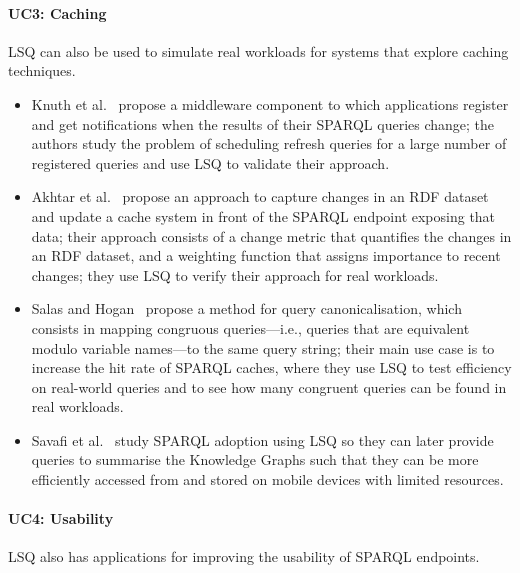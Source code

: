 \paragraph{UC3: Caching}
\label{sec-caching_uc}

LSQ can also be used to simulate real workloads for systems that explore caching techniques. 

\begin{itemize}
\item Knuth et al.~\cite{knuth2016scheduling} propose a middleware component to which applications register and get notifications when the results of their SPARQL queries change; the authors study the problem of scheduling refresh queries for a large number of registered queries and use LSQ to validate their approach. 
\item Akhtar et al.~\cite{akhtar2018change,akhtar2019dynamic} propose an approach to capture changes in an RDF dataset and update a cache system in front of the SPARQL endpoint exposing that data; their approach consists of a change metric that quantifies the changes in an RDF dataset, and a weighting function that assigns importance to recent changes; they use LSQ to verify their approach for real workloads. 
\item Salas and Hogan~\cite{SalasH18} propose a method for query canonicalisation, which consists in mapping congruous queries---i.e., queries that are equivalent modulo variable names---to the same query string; their main use case is to increase the hit rate of SPARQL caches, where they use LSQ to test efficiency on real-world queries and to see how many congruent queries can be found in real workloads.
\item Savafi et al.~\cite{safavi2019personalized} study SPARQL adoption using LSQ so they can later provide queries to summarise the Knowledge Graphs such that they can be more efficiently accessed from and stored on mobile devices with limited resources.
\end{itemize}

\paragraph{UC4: Usability}
\label{sec-usability_uc}

LSQ also has applications for improving the usability of SPARQL endpoints. 

